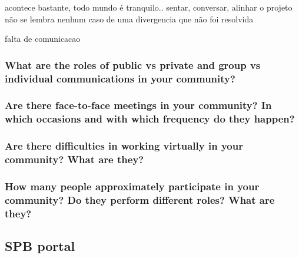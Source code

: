 \documentclass{sigchi}
\begin{document}
acontece bastante, todo mundo é tranquilo.. sentar, conversar, alinhar o projeto
não se lembra nenhum caso de uma divergencia que não foi resolvida

falta de comunicacao

\subsubsection{What are the roles of public vs private and group vs individual communications in your community?}
  
  
\subsubsection{Are there face-to-face meetings in your community? In which occasions and with which frequency do they happen?}

\subsubsection{Are there difficulties in working virtually in your community? What are they?}

\subsubsection{How many people approximately participate in your community? Do they perform different roles? What are they?}



\subsection{SPB portal}
\end{document}
